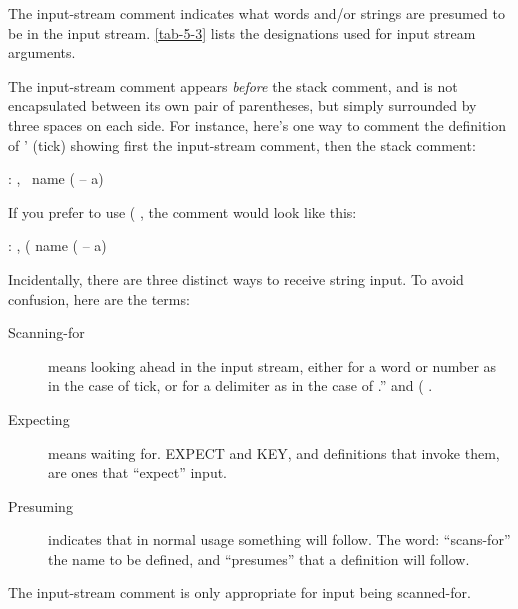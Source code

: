 The input-stream comment indicates what words and/or strings are
presumed to be in the input stream.  \ref{tab-5-3} lists the designations used
for input stream arguments.


The input-stream comment appears \emph{before} the stack comment, and
is not encapsulated between its own pair of parentheses, but simply surrounded
by three spaces on each side.  For instance, here's one way to
comment the definition of ' (tick) showing first the input-stream comment,
then the stack comment:
\begin{Code}
: ,   \ name   ( -- a)
\end{Code}
If you prefer to use ( , the comment would look like this:
\begin{Code}
: ,   ( name   ( -- a)
\end{Code}

Incidentally, there are three distinct ways to receive string input.  To
avoid confusion, here are the terms:
\begin{description}
\item[Scanning-for] means looking ahead in the input stream, either for a word or
number as in the case of tick, or for a delimiter as in the case of .'' and ( .
\item[Expecting] means waiting for.  EXPECT and KEY, and definitions that invoke
them, are ones that ``expect'' input.
\item[Presuming] indicates that in normal usage something will follow.  The word:
``scans-for'' the name to be defined, and ``presumes'' that a definition will
follow.
\end{description}
The input-stream comment is only appropriate for input being scanned-for.


